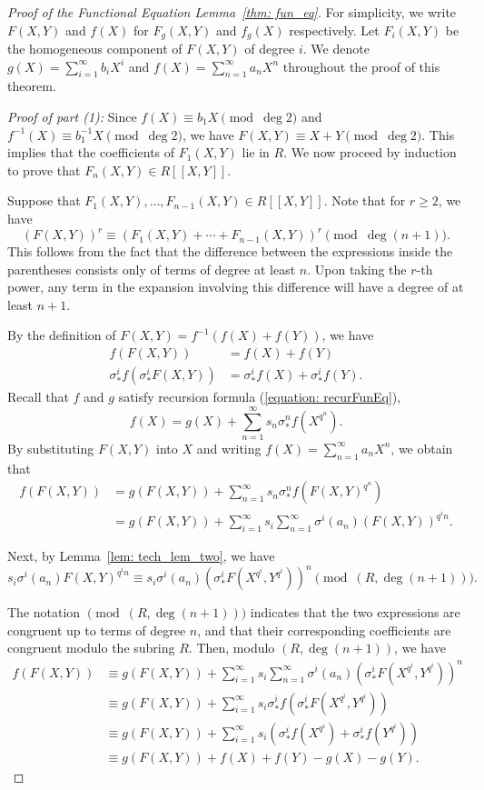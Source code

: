 \begin{proof}[Proof of the Functional Equation Lemma~\ref{thm: fun_eq}]
For simplicity, we write $F (X, Y)$ and $f (X)$ for $F_g(X, Y)$ and $f_g(X)$ respectively. Let $F_i(X,Y)$ be the
homogeneous component of $F(X,Y)$ of degree $i$. We denote
$g(X) = \sum_{i = 1}^{\infty} b_i X ^ i$ and $f(X) = \sum_{n=1}^{\infty}a_n X ^ n$ throughout
the proof of this theorem.

\textit{Proof of part (1):}
Since $f(X) \equiv b_1 X \pmod{\deg 2}$ and $f^{-1}(X) \equiv b_1^{-1} X \pmod{\deg 2}$, we have
$F(X, Y) \equiv X + Y \pmod{\deg 2}$. This implies that the coefficients of $F_1(X, Y)$ lie in $R$.
We now proceed by induction to prove that $F_n(X, Y) \in R[\![X, Y]\!]$.

Suppose that $F_1(X, Y), \dots, F_{n - 1}(X, Y) \in R[\![X, Y]\!]$. Note that for $r \ge 2$, we have
\[ (F(X, Y))^r \equiv (F_1(X, Y) + \cdots + F_{n- 1}(X, Y))^r \pmod{\deg(n + 1)}. \]
This follows from the fact that the difference between the expressions inside the
parentheses consists only of terms of degree at least $n$. Upon taking the $r$-th power, any
term in the expansion involving this difference will have a degree of at least $n+1$.

By the definition of $F(X, Y) = f^{- 1} (f (X) + f (Y))$, we have
\begin{align*}
    f (F (X, Y)) &= f (X) + f (Y)  \\
    \sigma_*^i f(\sigma_*^i F(X, Y)) &= \sigma_*^i f (X) + \sigma_*^i f (Y).
\end{align*}
Recall that $f$ and $g$ satisfy recursion formula (\ref{equation: recurFunEq}),
\[f (X) = g (X) + \sum_ {n = 1} ^ \infty s_n\sigma _*^n f (X ^ {q ^ n}).\]
By substituting $F(X, Y)$ into $X$ and writing $f(X)=\sum _{n = 1} ^ \infty a_n X ^ n$,
we obtain that
\begin{align*}
    f (F(X, Y)) & = g(F(X,Y)) + \sum_{n=1}^{\infty}s_n \sigma^n_* f(F(X,Y)^{q^n}) \\
            & = g (F(X, Y)) + \sum _{i = 1} ^ \infty s_i \sum _{n = 1} ^ \infty
            \sigma ^ i (a _n) (F(X, Y))^{q ^i n}.
\end{align*}

Next, by Lemma~\ref{lem: tech_lem_two}, we have
\[s_i \sigma^i(a_n) F(X, Y)^{q^i n} \equiv s_i\sigma^i(a_n) (\sigma_*^i F(X^{q^i}, Y^{q^i}))^n
\pmod{(R, \deg(n + 1))}. \]

The notation $\pmod{(R, \deg(n + 1))}$ indicates that the two expressions are congruent up to terms of degree $n$, and that their corresponding coefficients are congruent modulo the subring $R$. Then, modulo $(R, \deg(n + 1))$, we have
\[ \begin{aligned}
    f(F(X, Y)) & \equiv g(F(X, Y)) + \sum_{i = 1}^\infty s_i \sum_{n = 1}^\infty \sigma^i(a_n) (\sigma_*^i F(X^{q^i}, Y^{q^i}))^n \\
    & \equiv g(F(X, Y)) + \sum_{i = 1}^\infty s_i \sigma_*^i f (\sigma_*^i F(X^{q^i}, Y^{q^i})) \\
    & \equiv g(F(X, Y)) + \sum_{i = 1}^\infty s_i (\sigma_*^i f(X^{q^i}) + \sigma_*^i f(Y^{q^i})) \\
    & \equiv g(F(X, Y)) + f(X) + f(Y) - g(X) - g(Y).
\end{aligned} \]


\end{proof}
